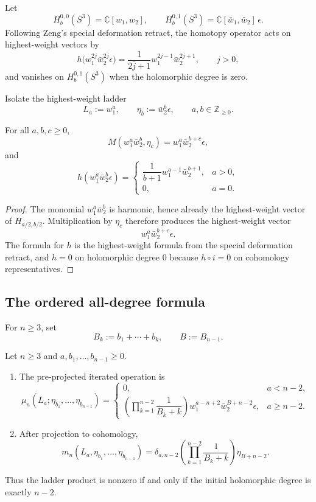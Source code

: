 Let
\[
H_b^{0,0}(S^3)=\mathbb{C}[w_1,w_2],
\qquad
H_b^{0,1}(S^3)=\mathbb{C}[\bar w_1,\bar w_2]\,\epsilon.
\]
Following Zeng's special deformation retract, the homotopy operator acts on highest-weight vectors by
\[
h\bigl(w_1^{2j}\bar w_2^{2\bar j}\epsilon\bigr)
=
\frac{1}{2\bar j+1}w_1^{2j-1}\bar w_2^{2\bar j+1},
\qquad j>0,
\]
and vanishes on $H_b^{0,1}(S^3)$ when the holomorphic degree is zero.

Isolate the highest-weight ladder
\[
L_a:=w_1^a,
\qquad
\eta_b:=\bar w_2^b\epsilon,
\qquad a,b\in \mathbb Z_{\ge0}.
\]

\begin{lemma}
\label{lem:cbt-ladder-closure-bf}
\ClaimStatusProvedHere
For all $a,b,c\ge0$,
\[
M(w_1^a\bar w_2^b,\eta_c)=w_1^a\bar w_2^{b+c}\epsilon,
\]
and
\[
h(w_1^a\bar w_2^b\epsilon)=
\begin{cases}
\dfrac{1}{b+1}w_1^{a-1}\bar w_2^{b+1}, & a>0,\\[1ex]
0, & a=0.
\end{cases}
\]
\end{lemma}

\begin{proof}
The monomial $w_1^a\bar w_2^b$ is harmonic, hence already the highest-weight vector of $H_{a/2,b/2}$. Multiplication by $\eta_c$ therefore produces the highest-weight vector
\[
w_1^a\bar w_2^{b+c}\epsilon.
\]
The formula for $h$ is the highest-weight formula from the special deformation retract, and $h=0$ on holomorphic degree $0$ because $h\circ i=0$ on cohomology representatives.
\end{proof}

\subsection{The ordered all-degree formula}
\label{sec:cbt-ordered-all-degree}

For $n\ge3$, set
\[
B_k:=b_1+\cdots+b_k,
\qquad
B:=B_{n-1}.
\]

\begin{theorem}
\label{thm:cbt-bf-ladder}
\ClaimStatusProvedHere
Let $n\ge3$ and $a,b_1,\dots,b_{n-1}\ge0$.
\begin{enumerate}[label=\textup{(\roman*)},leftmargin=2em]
\item The pre-projected iterated operation is
\[
\mu_n(L_a;\eta_{b_1},\dots,\eta_{b_{n-1}})
=
\begin{cases}
0, & a<n-2,\\[2ex]
\left(\prod_{k=1}^{n-2}\dfrac{1}{B_k+k}\right)
w_1^{a-n+2}\bar w_2^{B+n-2}\epsilon, & a\ge n-2.
\end{cases}
\]
\item After projection to cohomology,
\[
m_n(L_a,\eta_{b_1},\dots,\eta_{b_{n-1}})
=
\delta_{a,n-2}
\left(\prod_{k=1}^{n-2}\frac{1}{B_k+k}\right)\eta_{B+n-2}.
\]
\end{enumerate}
Thus the ladder product is nonzero if and only if the initial holomorphic degree is exactly $n-2$.
\end{theorem}

